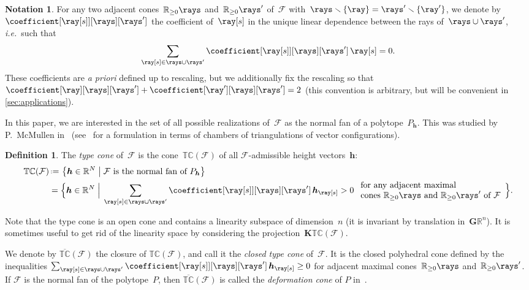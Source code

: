 \documentclass{amsart}
\theoremstyle{definition}
\newtheorem{definition}[theorem]{Definition}
\newtheorem{notation}[theorem]{Notation}
\newcommand{\R}{\mathbb{R}} %
\renewcommand{\b}[1]{{\boldsymbol{#1}}} %
\newcommand{\set}[2]{\left\{ #1 \;\middle|\; #2 \right\}} %
\newcommand{\Bigset}[2]{\Big\{ #1 \;\Big|\; #2 \Big\}} %
\newcommand{\ssm}{\smallsetminus} %
\newcommand{\eqdef}{\mbox{\,\raisebox{0.2ex}{\scriptsize\ensuremath{\mathrm:}}\ensuremath{=}\,}} %
\newcommand{\ie}{\textit{i.e.}~} %
\newcommand{\apriori}{\textit{a priori}} %
\newcommand{\darkblue}{\color{darkblue}} %
\newcommand{\defn}[1]{\textsl{\darkblue #1}} %
\newcommand{\Fan}{\mathcal{F}} %
\newcommand{\typeCone}{\mathbb{TC}} %
\newcommand{\ctypeCone}{\overline{\mathbb{TC}}} %
\begin{document}
\begin{notation}
For any two adjacent cones~$\R_{\ge0}\rays$ and~$\R_{\ge0}\rays'$ of~$\Fan$ with~$\rays \ssm \{\ray\} = \rays' \ssm \{\ray'\}$, we denote by~$\coefficient[{\ray[s]}][\rays][\rays']$ the coefficient of~$\ray[s]$ in the unique linear dependence between the rays of~$\rays \cup \rays'$, \ie such that
\[
\sum_{\ray[s] \in \rays \cup \rays'} \coefficient[{\ray[s]}][\rays][\rays'] \, \ray[s] = 0.
\]
These coefficients are \apriori{} defined up to rescaling, but we additionally fix the rescaling so that~${\coefficient[\ray][\rays][\rays'] + \coefficient[\ray'][\rays][\rays'] = 2}$ (this convention is arbitrary, but will be convenient in \cref{sec:applications}).
\end{notation}

In this paper, we are interested in the set of all possible realizations of~$\Fan$ as the normal fan of a polytope~$P_\b{h}$. This was studied by P.~McMullen in~\cite{McMullen-typeCone} (see~\cite[Sect.~9.5]{DeLoeraRambauSantos} for a formulation in terms of chambers of triangulations of vector configurations).

\begin{definition}
\label{def:typeCone}
The \defn{type cone} of~$\Fan$ is the cone~$\typeCone(\Fan)$ of all $\Fan$-admissible height vectors~$\b{h}$:
\begin{align*}
\typeCone(\Fan) & \eqdef \set{\b{h} \in \R^N}{\Fan \text{ is the normal fan of } P_\b{h}} \\
& = \Bigset{\b{h} \in \R^N}{\sum_{\ray[s] \in \rays \cup \rays'} \coefficient[{\ray[s]}][\rays][\rays'] \, \b{h}_{\ray[s]} > 0 \; \begin{array}{l} \text{for any adjacent maximal} \\ \text{cones~$\R_{\ge0}\rays$ and~$\R_{\ge0}\rays'$ of~$\Fan$} \end{array}}.
\end{align*}
\end{definition}

Note that the type cone is an open cone and contains a linearity subspace of dimension~$n$ (it is invariant by translation in~$\b{G} \R^n$). 
It is sometimes useful to get rid of the linearity space by considering the projection~$\b{K}\typeCone(\Fan)$. 

We denote by $\ctypeCone(\Fan)$ the closure of $\typeCone(\Fan)$, and call it the \defn{closed type cone} of~$\Fan$. It is the closed polyhedral cone defined by the inequalities $\sum_{\ray[s] \in \rays \cup \rays'} \coefficient[{\ray[s]}][\rays][\rays'] \, \b{h}_{\ray[s]} \geq 0$ for adjacent maximal cones~$\R_{\ge0}\rays$ and~$\R_{\ge0}\rays'$. If $\Fan$ is the normal fan of the polytope~$P$, then $\ctypeCone(\Fan)$ is called the \defn{deformation cone} of $P$ in~\cite{Postnikov}.
\end{document}
